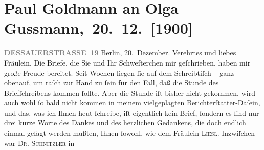                \section[ Paul Goldmann an Olga Gussmann, 20. 12. {[}1900{]}]{ Paul Goldmann an Olga Gussmann, 20. 12. {[}1900{]}}\nopagebreak{}\rehead{ }\begin{ledgroupsized}[t]{13cm}\normalsize\beginnumbering \toendnotes[C]{\smallbreak\pagebreak[2]} 
\toendnotes[C]{\smallbreak}\pstart
           \noindent{}\raggedleft{}{\pb}\textcolor{gray}{\textbf{DESSAUERSTRASSE 19}}\pend
           \pstart
           Berlin, 20. Dezember.\pend
           \pstart{}Verehrtes und liebes Fräulein,\pend\pstart
           Die Briefe, die Sie und Ihr Schweſterchen mir geſchrieben, haben mir  große Freude bereitet. Seit Wochen liegen ſie auf dem Schreibtiſch – ganz
               obenauf, um raſch zur Hand zu ſein für den Fall, daß die Stunde des Briefſchreibens
               kommen ſollte. Aber die Stunde iſt bisher nicht gekommen, wird auch wohl ſo bald
               nicht kommen in meinem vielgeplagten Berichterſtatter-Daſein, und das, was ich Ihnen
                  heut ſchreibe, iſt eigentlich kein Brief, ſondern
               es ſind nur drei kurze Worte des Dankes und des herzlichen Gedankens, die doch
               endlich einmal geſagt werden mußten, Ihnen {\pb}ſowohl,
               wie dem Fräulein \textsc{Liesl}.\pend
           \pstart
           Inzwiſchen war \textsc{Dr. Schnitzler} in \label{K_L03537-1v}
\end{ledgroupsized}
